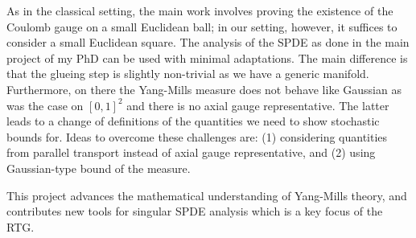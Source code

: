 \documentclass[12pt]{article}
\numberwithin{equation}{section}
\theoremstyle{definition}
\theoremstyle{remark}
\newcommand{\1}{\mathbf 1}
\newcommand{\<}{\langle}
\renewcommand{\>}{\rangle}
\begin{document}
As in the classical setting, the main work involves proving the existence of the Coulomb
gauge on a small Euclidean ball; in our setting, however, it suffices to consider a small
Euclidean square. The analysis of the SPDE as done in the main project of my PhD can be used with minimal adaptations. The main difference is that the glueing step is slightly non-trivial as we have a generic manifold. Furthermore, on there the Yang-Mills measure does not behave like Gaussian as was the case on $[0,1]^2$ and there is no axial gauge representative. The latter leads to a change of definitions of the quantities we need to show stochastic bounds for. Ideas to overcome these challenges are: (1) considering quantities from parallel transport instead of axial gauge representative, and (2) using Gaussian-type bound of the measure. 

This project advances the mathematical understanding of Yang-Mills theory, and contributes new tools for singular SPDE analysis which is a key focus of the RTG. 

  
%
%




%
\end{document}

